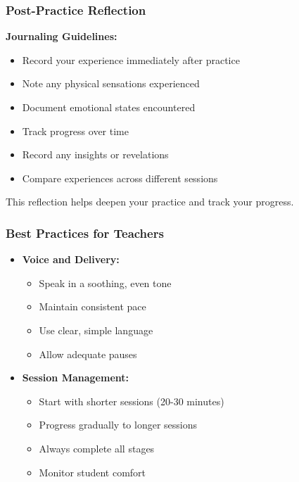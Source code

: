 \begin{frame}[fragile]\frametitle{Post-Practice Reflection}
    \textbf{Journaling Guidelines:}
    \begin{itemize}
        \item Record your experience immediately after practice
        \item Note any physical sensations experienced
        \item Document emotional states encountered
        \item Track progress over time
        \item Record any insights or revelations
        \item Compare experiences across different sessions
    \end{itemize}
    \small{This reflection helps deepen your practice and track your progress.}
\end{frame}

\begin{frame}[fragile]\frametitle{Best Practices for Teachers}
    \begin{itemize}
        \item \textbf{Voice and Delivery:}
        \begin{itemize}
            \item Speak in a soothing, even tone
            \item Maintain consistent pace
            \item Use clear, simple language
            \item Allow adequate pauses
        \end{itemize}
        \item \textbf{Session Management:}
        \begin{itemize}
            \item Start with shorter sessions (20-30 minutes)
            \item Progress gradually to longer sessions
            \item Always complete all stages
            \item Monitor student comfort
        \end{itemize}
    \end{itemize}
\end{frame}

